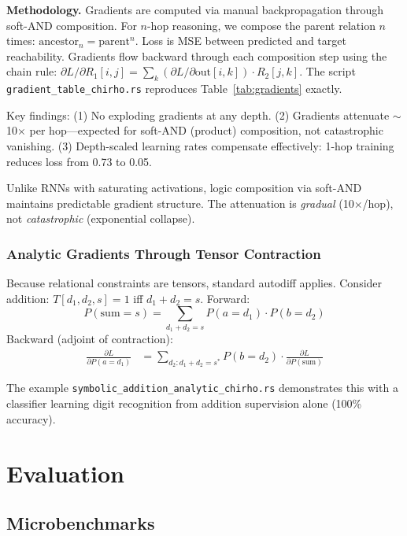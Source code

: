 \documentclass[11pt,a4paper]{article}
\begin{document}
\textbf{Methodology.}
Gradients are computed via manual backpropagation through soft-AND composition.
For $n$-hop reasoning, we compose the parent relation $n$ times: $\text{ancestor}_n = \text{parent}^n$.
Loss is MSE between predicted and target reachability.
Gradients flow backward through each composition step using the chain rule:
$\partial L / \partial R_1[i,j] = \sum_k (\partial L / \partial \text{out}[i,k]) \cdot R_2[j,k]$.
The script \texttt{gradient\_table\_chirho.rs} reproduces Table~\ref{tab:gradients} exactly.

Key findings: (1) No exploding gradients at any depth. (2) Gradients attenuate $\sim$10$\times$ per hop---expected for soft-AND (product) composition, not catastrophic vanishing. (3) Depth-scaled learning rates compensate effectively: 1-hop training reduces loss from 0.73 to 0.05.

Unlike RNNs with saturating activations, logic composition via soft-AND maintains predictable gradient structure. The attenuation is \emph{gradual} (10$\times$/hop), not \emph{catastrophic} (exponential collapse).

\subsubsection{Analytic Gradients Through Tensor Contraction}

Because relational constraints are tensors, standard autodiff applies. Consider addition: $T[d_1, d_2, s] = 1$ iff $d_1 + d_2 = s$. Forward:
\[
P(\text{sum}=s) = \sum_{d_1 + d_2 = s} P(a = d_1) \cdot P(b = d_2)
\]
Backward (adjoint of contraction):
\begin{align}
\frac{\partial L}{\partial P(a = d_1)} &= \sum_{d_2 : d_1 + d_2 = s^*} P(b = d_2) \cdot \frac{\partial L}{\partial P(\text{sum})}
\end{align}

The example \texttt{symbolic\_addition\_analytic\_chirho.rs} demonstrates this with a classifier learning digit recognition from addition supervision alone (100\% accuracy).

\section{Evaluation}

\subsection{Microbenchmarks}
\end{document}
